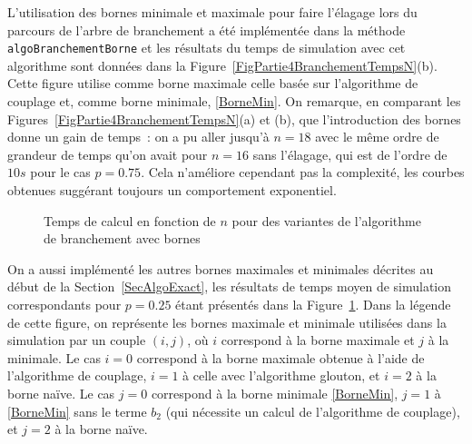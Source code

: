 \documentclass[a4paper,11pt]{amsart}
\theoremstyle{plain}
\begin{document}
%

L'utilisation des bornes minimale et maximale pour faire l'élagage lors du parcours de l'arbre de branchement a été implémentée dans la méthode \texttt{algoBranchementBorne} et les résultats du temps de simulation avec cet algorithme sont données dans la Figure~\ref{FigPartie4BranchementTempsN}(b). Cette figure utilise comme borne maximale celle basée sur l'algorithme de couplage et, comme borne minimale, \eqref{BorneMin}. On remarque, en comparant les Figures~\ref{FigPartie4BranchementTempsN}(a) et (b), que l'introduction des bornes donne un gain de temps~: on a pu aller jusqu'à $n = 18$ avec le même ordre de grandeur de temps qu'on avait pour $n = 16$ sans l'élagage, qui est de l'ordre de $10s$ pour le cas $p = 0.75$. Cela n'améliore cependant pas la complexité, les courbes obtenues suggérant toujours un comportement exponentiel.

\begin{figure}[ht]
\centering
\resizebox{0.5\textwidth}{!}{}
\caption{Temps de calcul en fonction de $n$ pour des variantes de l'algorithme de branchement avec bornes}
\label{FigPartie4BranchementBornesTempsN}
\end{figure}

On a aussi implémenté les autres bornes maximales et minimales décrites au début de la Section~\ref{SecAlgoExact}, les résultats de temps moyen de simulation correspondants pour $p = 0.25$ étant présentés dans la Figure~\ref{FigPartie4BranchementBornesTempsN}. Dans la légende de cette figure, on représente les bornes maximale et minimale utilisées dans la simulation par un couple $(i, j)$, où $i$ correspond à la borne maximale et $j$ à la minimale. Le cas $i = 0$ correspond à la borne maximale obtenue à l'aide de l'algorithme de couplage, $i = 1$ à celle avec l'algorithme glouton, et $i = 2$ à la borne naïve. Le cas $j = 0$ correspond à la borne minimale \eqref{BorneMin}, $j = 1$ à \eqref{BorneMin} sans le terme $b_2$ (qui nécessite un calcul de l'algorithme de couplage), et $j = 2$ à la borne naïve.
\end{document}
